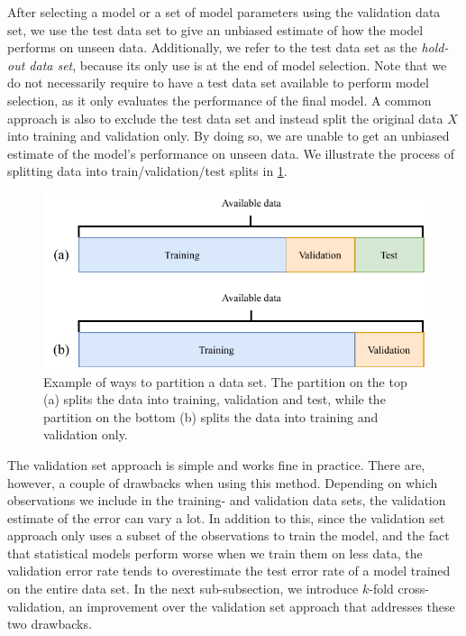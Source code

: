 After selecting a model or a set of model parameters using the validation data set, we use the test data set to give an unbiased estimate of how the model performs on unseen data. Additionally, we refer to the test data set as the \textit{hold-out data set}, because its only use is at the end of model selection. Note that we do not necessarily require to have a test data set available to perform model selection, as it only evaluates the performance of the final model. A common approach is also to exclude the test data set and instead split the original data $X$ into training and validation only. By doing so, we are unable to get an unbiased estimate of the model's performance on unseen data. We illustrate the process of splitting data into train/validation/test splits in \cref{fig:train-val-test-splits}.
\begin{figure}[H]
    \centering
    \includegraphics[width=\textwidth]{thesis/figures/train-val-test-splits_cropped.pdf}
    \caption{Example of ways to partition a data set. The partition on the top (a) splits the data into training, validation and test, while the partition on the bottom (b) splits the data into training and validation only.}
    \label{fig:train-val-test-splits}
\end{figure}

The validation set approach is simple and works fine in practice. There are, however, a couple of drawbacks when using this method. Depending on which observations we include in the training- and validation data sets, the validation estimate of the error can vary a lot. In addition to this, since the validation set approach only uses a subset of the observations to train the model, and the fact that statistical models perform worse when we train them on less data, the validation error rate tends to overestimate the test error rate of a model trained on the entire data set. In the next sub-subsection, we introduce $k$-fold cross-validation, an improvement over the validation set approach that addresses these two drawbacks.

